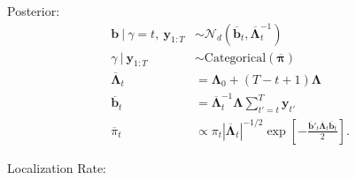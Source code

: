 \documentclass{article}
\begin{document}
Posterior:
\begin{align*}
    \mathbf{b} \:|\: \gamma = t, \: \mathbf{y}_{1:T} &\sim \mathcal{N}_d\left(\overline{\mathbf{b}}_{t}, \overline{\pmb{\Lambda}}_{t}^{-1}\right)  \\
    \gamma \:|\: \mathbf{y}_{1:T} &\sim \text{Categorical}(\overline{\pmb{\pi}}) \\
    \overline{\pmb{\Lambda}}_t &= \pmb{\Lambda}_0 + (T-t+1) \pmb{\Lambda} \\
    \overline{\mathbf{b}}_t &= \overline{\pmb{\Lambda}}^{-1}_{t}\pmb{\Lambda}\sum_{t'=t}^{T} \mathbf{y}_{t'} \\
    \overline{\pi}_t &\propto \pi_t|\overline{\pmb{\Lambda}}_t|^{-1/2}\exp\left[-\frac{ \overline{\mathbf{b}}'_t \overline{\pmb{\Lambda}}_t \overline{\mathbf{b}}_t}{2}\right].
\end{align*}

Localization Rate:
\end{document}
